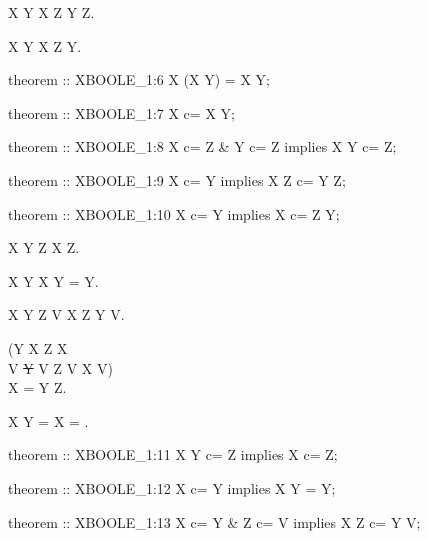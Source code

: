 \begin{paracol}{2}
\begin{theorem}
  X \subset Y \implies X \cup Z \subset Y \cup Z.
\end{theorem}

\begin{theorem}
  X \subset Y \implies X \subset Z \cup Y.
\end{theorem}

\switchcolumn

\begin{mizar}
theorem :: XBOOLE_1:6
  X \/ (X \/ Y) = X \/ Y;

theorem :: XBOOLE_1:7
  X c= X \/ Y;

theorem :: XBOOLE_1:8
  X c= Z & Y c= Z implies X \/ Y c= Z;

theorem :: XBOOLE_1:9
  X c= Y implies X \/ Z c= Y \/ Z;

theorem :: XBOOLE_1:10
  X c= Y implies X c= Z \/ Y;
\end{mizar}

\switchcolumn*\ensurevspace{5cm}

\begin{theorem}
  X \cup Y \subset Z \implies X \subset Z.
\end{theorem}

\begin{theorem}
  X \subset Y \implies X \cup Y = Y.
\end{theorem}

\begin{theorem}
  X \subset Y \land Z \subset V \implies X \cup Z \subset Y \cup V.
\end{theorem}

\begin{theorem+}
  (Y \subset X \land Z \subset X \land\\
  \forall V \st Y \subset V \land Z \subset V
  \holds X \subset V) \\
  \implies X = Y \cup Z.
\end{theorem+}

\begin{theorem}
  X \cup Y = \emptyset \implies X = \emptyset.
\end{theorem}

\switchcolumn

\begin{mizar}
theorem :: XBOOLE_1:11
  X \/ Y c= Z implies X c= Z;

theorem :: XBOOLE_1:12
  X c= Y implies X \/ Y = Y;

theorem :: XBOOLE_1:13
  X c= Y & Z c= V implies
  X \/ Z c= Y \/ V;


\end{mizar}
\end{paracol}
